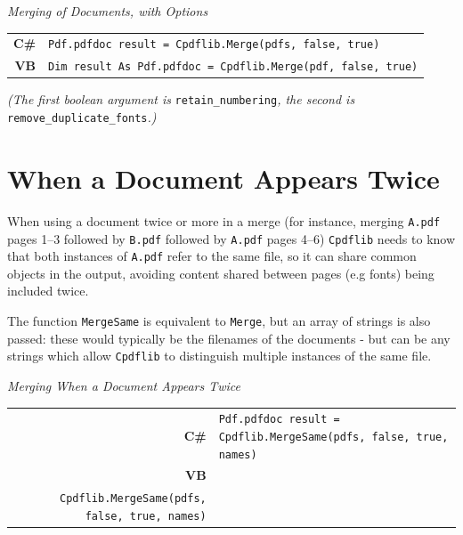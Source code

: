 \documentclass[a4paper]{memoir}
\begin{document}
\begin{framed}
\noindent\textit{Merging of Documents, with Options}\\

\noindent\begin{tabular}{rl}
\small\sffamily\textbf{C\#} &
\begin{minipage}{4in}
\small\verb!Pdf.pdfdoc result = Cpdflib.Merge(pdfs, false, true)!
\end{minipage}\\[5mm]
\small\sffamily\textbf{VB} &
\begin{minipage}{4in}
\small\verb!Dim result As Pdf.pdfdoc = Cpdflib.Merge(pdf, false, true)!
\end{minipage}\\[5mm]
\end{tabular}

\sloppy\textit{(The first boolean argument is }\verb!retain_numbering!\textit{, the second is }\verb!remove_duplicate_fonts!\textit{.)}
\end{framed}

\section{When a Document Appears Twice}

When using a document twice or more in a merge (for instance, merging \verb!A.pdf! pages 1--3 followed by \verb!B.pdf! followed by \verb!A.pdf! pages 4--6) \verb!Cpdflib! needs to know that both instances of \verb!A.pdf! refer to the same file, so it can share common objects in the output, avoiding content shared between pages (e.g fonts) being included twice.

The function \verb!MergeSame! is equivalent to \verb!Merge!, but an array of strings is also passed: these would typically be the filenames of the documents - but can be any strings which allow \verb!Cpdflib! to distinguish multiple instances of the same file.

\begin{framed}
\noindent\textit{Merging When a Document Appears Twice}\\

\noindent\begin{tabular}{rl}
\small\sffamily\textbf{C\#} &
\begin{minipage}{4in}
\small\verb!Pdf.pdfdoc result = Cpdflib.MergeSame(pdfs, false, true, names)!
\end{minipage}\\[5mm]
\small\sffamily\textbf{VB} &
\begin{minipage}{4in}
\small\verb!Dim result As Pdf.pdfdoc =!\\
\small\verb!  Cpdflib.MergeSame(pdfs, false, true, names)!
\end{minipage}\\[5mm]
\end{tabular}
\end{framed}
\end{document}

